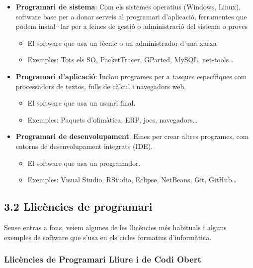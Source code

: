 \documentclass[
  12 pt,
  a4paper,
]{article}
\providecommand{\tightlist}{%
  \setlength{\itemsep}{0pt}\setlength{\parskip}{0pt}}
\begin{document}
\begin{itemize}
\item
  \textbf{Programari de sistema}: Com els sistemes operatius (Windows,
  Linux), software base per a donar serveis al programari d'aplicació,
  ferramentes que podem instal·lar per a feines de gestió o
  administració del sistema o proves

  \begin{itemize}
  \tightlist
  \item
    El software que usa un tècnic o un administrador d'una xarxa
  \item
    Exemples: Tots els SO, PacketTracer, GParted, MySQL,
    net-tools\ldots{}
  \end{itemize}
\item
  \textbf{Programari d'aplicació}: Inclou programes per a tasques
  específiques com processadors de textos, fulls de càlcul i navegadors
  web.

  \begin{itemize}
  \tightlist
  \item
    El software que usa un usuari final.
  \item
    Exemples: Paquets d'ofimàtica, ERP, jocs, navegadors\ldots{}
  \end{itemize}
\item
  \textbf{Programari de desenvolupament}: Eines per crear altres
  programes, com entorns de desenvolupament integrats (IDE).

  \begin{itemize}
  \item
    El software que usa un programador.
  \item
    Exemples: Visual Studio, RStudio, Eclipse, NetBeans, Git,
    GitHub\ldots{}
  \end{itemize}
\end{itemize}

\subsection{3.2 Llicències de
programari}\label{llicuxe8ncies-de-programari}

Sense entras a fons, veiem algunes de les llicències més habituals i
alguns exemples de software que s'usa en els cicles formatius
d'informàtica.

\subsubsection{Llicències de Programari Lliure i de Codi
Obert}\label{llicuxe8ncies-de-programari-lliure-i-de-codi-obert}
\end{document}
